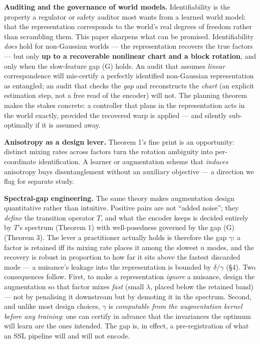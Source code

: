 \documentclass[
  letterpaper,
  11pt]{article}
\theoremstyle{plain}
\theoremstyle{definition}
\theoremstyle{remark}
\begin{document}
\textbf{Auditing and the governance of world models.} Identifiability is the property a regulator or safety auditor most wants from a learned world model: that the representation corresponds to the world's real degrees of freedom rather than scrambling them. This paper sharpens what can be promised. Identifiability \emph{does} hold for non-Gaussian worlds --- the representation recovers the true factors --- but only \textbf{up to a recoverable nonlinear chart and a block rotation}, and only when the slow-feature gap (G) holds. An audit that assumes \emph{linear} correspondence will mis-certify a perfectly identified non-Gaussian representation as entangled; an audit that checks the \emph{gap} and reconstructs the \emph{chart} (an explicit estimation step, not a free read of the encoder) will not. The planning theorem makes the stakes concrete: a controller that plans in the representation acts in the world exactly, provided the recovered warp is applied --- and silently sub-optimally if it is assumed away.

\textbf{Anisotropy as a design lever.} Theorem 1's fine print is an opportunity: distinct mixing rates across factors turn the rotation ambiguity into per-coordinate identification. A learner or augmentation scheme that \emph{induces} anisotropy buys disentanglement without an auxiliary objective --- a direction we flag for separate study.

\textbf{Spectral-gap engineering.} The same theory makes augmentation design quantitative rather than intuitive. Positive pairs are not ``added noise''; they \emph{define} the transition operator \(T\), and what the encoder keeps is decided entirely by \(T\)'s spectrum (Theorem 1) with well-posedness governed by the gap (G) (Theorem 3). The lever a practitioner actually holds is therefore the gap \(\gamma\): a factor is retained iff its mixing rate places it among the slowest \(n\) modes, and the recovery is robust in proportion to how far it sits above the fastest discarded mode --- a nuisance's leakage into the representation is bounded by \(\delta/\gamma\) (§4). Two consequences follow. First, to make a representation \emph{ignore} a nuisance, design the augmentation so that factor mixes \emph{fast} (small \(\lambda\), placed below the retained band) --- not by penalising it downstream but by demoting it in the spectrum. Second, and unlike most design choices, \(\gamma\) is \emph{computable from the augmentation kernel before any training}: one can certify in advance that the invariances the optimum will learn are the ones intended. The gap is, in effect, a pre-registration of what an SSL pipeline will and will not encode.
\end{document}
